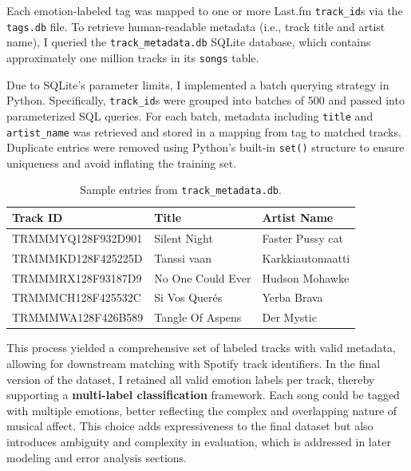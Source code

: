 \documentclass{article}
\begin{document}
Each emotion-labeled tag was mapped to one or more Last.fm \texttt{track\_id}s via the \texttt{tags.db} file. To retrieve human-readable metadata (i.e., track title and artist name), I queried the \texttt{track\_metadata.db} SQLite database, which contains approximately one million tracks in its \texttt{songs} table.

Due to SQLite's parameter limits, I implemented a batch querying strategy in Python. Specifically, \texttt{track\_id}s were grouped into batches of 500 and passed into parameterized SQL queries. For each batch, metadata including \texttt{title} and \texttt{artist\_name} was retrieved and stored in a mapping from tag to matched tracks. Duplicate entries were removed using Python’s built-in \texttt{set()} structure to ensure uniqueness and avoid inflating the training set.

\begin{table}[H]
\centering
\begin{tabular}{|l|l|l|}
\hline
\textbf{Track ID} & \textbf{Title} & \textbf{Artist Name} \\
\hline
TRMMMYQ128F932D901 & Silent Night & Faster Pussy cat \\
TRMMMKD128F425225D & Tanssi vaan & Karkkiautomaatti \\
TRMMMRX128F93187D9 & No One Could Ever & Hudson Mohawke \\
TRMMMCH128F425532C & Si Vos Querés & Yerba Brava \\
TRMMMWA128F426B589 & Tangle Of Aspens & Der Mystic \\
\hline
\end{tabular}
\caption{Sample entries from \texttt{track\_metadata.db}.}
\end{table}

This process yielded a comprehensive set of labeled tracks with valid metadata, allowing for downstream matching with Spotify track identifiers. In the final version of the dataset, I retained all valid emotion labels per track, thereby supporting a \textbf{multi-label classification} framework. Each song could be tagged with multiple emotions, better reflecting the complex and overlapping nature of musical affect. This choice adds expressiveness to the final dataset but also introduces ambiguity and complexity in evaluation, which is addressed in later modeling and error analysis sections.
\end{document}
